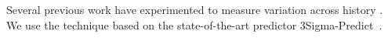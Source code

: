 Several previous work have experimented to
measure variation across history \cite{morpheus, corral, 3Sigma,
jockey:eurosys2012}. We use the technique based on the state-of-the-art
predictor 3Sigma-Predict~\cite{3Sigma}.
\fi

%

